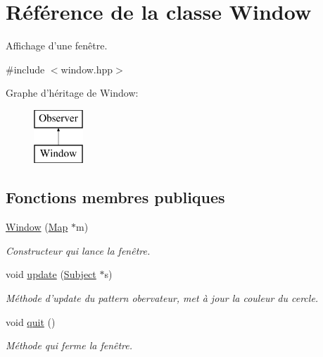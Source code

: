 \hypertarget{classWindow}{\section{Référence de la classe Window}
\label{classWindow}
}


Affichage d'une fenêtre.  




{\ttfamily \#include $<$window.\+hpp$>$}

Graphe d'héritage de Window\+:\begin{figure}[H]
\begin{center}
\leavevmode
\includegraphics[height=2.000000cm]{classWindow}
\end{center}
\end{figure}
\subsection*{Fonctions membres publiques}
\begin{DoxyCompactItemize}
\item 
\hypertarget{classWindow_a2e2ce3cfbd3e468d389d8a9212e7b2ac}{\hyperlink{classWindow_a2e2ce3cfbd3e468d389d8a9212e7b2ac}{Window} (\hyperlink{classMap}{Map} $\ast$m)}\label{classWindow_a2e2ce3cfbd3e468d389d8a9212e7b2ac}

\begin{DoxyCompactList}\small\item\em Constructeur qui lance la fenêtre. \end{DoxyCompactList}\item 
void \hyperlink{classWindow_a23acb0c66756df8121ce5d54a8c28d72}{update} (\hyperlink{classSubject}{Subject} $\ast$s)
\begin{DoxyCompactList}\small\item\em Méthode d'update du pattern obervateur, met à jour la couleur du cercle. \end{DoxyCompactList}\item 
\hypertarget{classWindow_ad21ca1bd9a5c01411800f931bd7b1f7d}{void \hyperlink{classWindow_ad21ca1bd9a5c01411800f931bd7b1f7d}{quit} ()}\label{classWindow_ad21ca1bd9a5c01411800f931bd7b1f7d}

\begin{DoxyCompactList}\small\item\em Méthode qui ferme la fenêtre. \end{DoxyCompactList}\end{DoxyCompactItemize}



